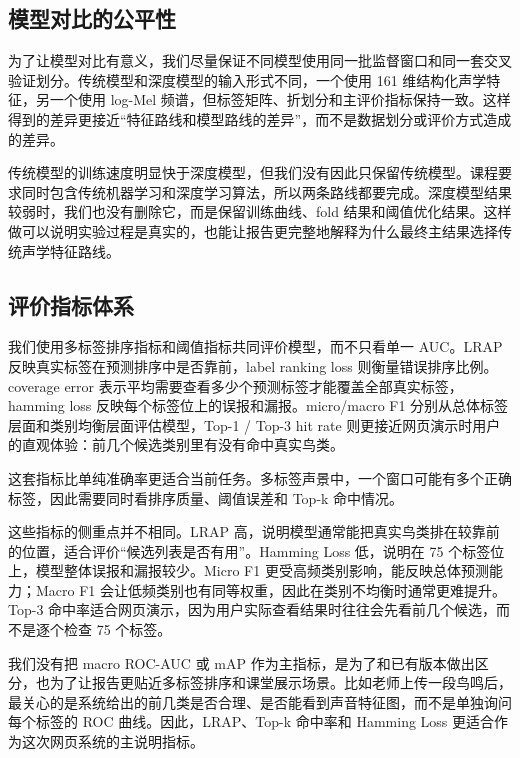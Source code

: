 \documentclass[12pt,a4paper]{article}
\begin{document}
\subsection{模型对比的公平性}
为了让模型对比有意义，我们尽量保证不同模型使用同一批监督窗口和同一套交叉验证划分。传统模型和深度模型的输入形式不同，一个使用 161 维结构化声学特征，另一个使用 log-Mel 频谱，但标签矩阵、折划分和主评价指标保持一致。这样得到的差异更接近“特征路线和模型路线的差异”，而不是数据划分或评价方式造成的差异。

传统模型的训练速度明显快于深度模型，但我们没有因此只保留传统模型。课程要求同时包含传统机器学习和深度学习算法，所以两条路线都要完成。深度模型结果较弱时，我们也没有删除它，而是保留训练曲线、fold 结果和阈值优化结果。这样做可以说明实验过程是真实的，也能让报告更完整地解释为什么最终主结果选择传统声学特征路线。

\subsection{评价指标体系}
我们使用多标签排序指标和阈值指标共同评价模型，而不只看单一 AUC。LRAP 反映真实标签在预测排序中是否靠前，label ranking loss 则衡量错误排序比例。coverage error 表示平均需要查看多少个预测标签才能覆盖全部真实标签，hamming loss 反映每个标签位上的误报和漏报。micro/macro F1 分别从总体标签层面和类别均衡层面评估模型，Top-1 / Top-3 hit rate 则更接近网页演示时用户的直观体验：前几个候选类别里有没有命中真实鸟类。

这套指标比单纯准确率更适合当前任务。多标签声景中，一个窗口可能有多个正确标签，因此需要同时看排序质量、阈值误差和 Top-k 命中情况。

这些指标的侧重点并不相同。LRAP 高，说明模型通常能把真实鸟类排在较靠前的位置，适合评价“候选列表是否有用”。Hamming Loss 低，说明在 75 个标签位上，模型整体误报和漏报较少。Micro F1 更受高频类别影响，能反映总体预测能力；Macro F1 会让低频类别也有同等权重，因此在类别不均衡时通常更难提升。Top-3 命中率适合网页演示，因为用户实际查看结果时往往会先看前几个候选，而不是逐个检查 75 个标签。

我们没有把 macro ROC-AUC 或 mAP 作为主指标，是为了和已有版本做出区分，也为了让报告更贴近多标签排序和课堂展示场景。比如老师上传一段鸟鸣后，最关心的是系统给出的前几类是否合理、是否能看到声音特征图，而不是单独询问每个标签的 ROC 曲线。因此，LRAP、Top-k 命中率和 Hamming Loss 更适合作为这次网页系统的主说明指标。
\end{document}
